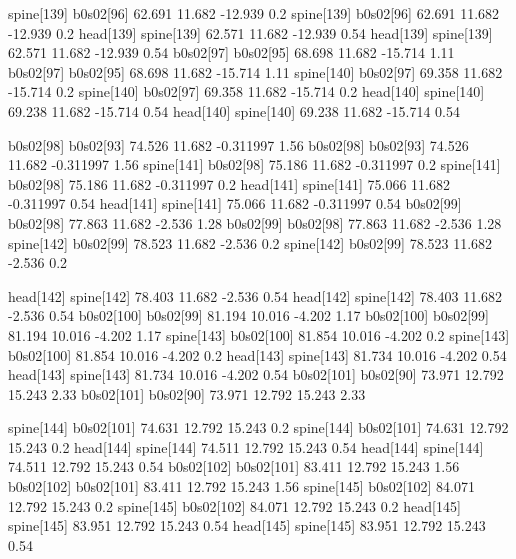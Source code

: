 spine[139]    b0s02[96]    62.691    11.682    -12.939    0.2
spine[139]    b0s02[96]    62.691    11.682    -12.939    0.2
head[139]    spine[139]    62.571    11.682    -12.939    0.54
head[139]    spine[139]    62.571    11.682    -12.939    0.54
b0s02[97]    b0s02[95]    68.698    11.682    -15.714    1.11
b0s02[97]    b0s02[95]    68.698    11.682    -15.714    1.11
spine[140]    b0s02[97]    69.358    11.682    -15.714    0.2
spine[140]    b0s02[97]    69.358    11.682    -15.714    0.2
head[140]    spine[140]    69.238    11.682    -15.714    0.54
head[140]    spine[140]    69.238    11.682    -15.714    0.54


b0s02[98]    b0s02[93]    74.526    11.682    -0.311997    1.56
b0s02[98]    b0s02[93]    74.526    11.682    -0.311997    1.56
spine[141]    b0s02[98]    75.186    11.682    -0.311997    0.2
spine[141]    b0s02[98]    75.186    11.682    -0.311997    0.2
head[141]    spine[141]    75.066    11.682    -0.311997    0.54
head[141]    spine[141]    75.066    11.682    -0.311997    0.54
b0s02[99]    b0s02[98]    77.863    11.682    -2.536    1.28
b0s02[99]    b0s02[98]    77.863    11.682    -2.536    1.28
spine[142]    b0s02[99]    78.523    11.682    -2.536    0.2
spine[142]    b0s02[99]    78.523    11.682    -2.536    0.2


head[142]    spine[142]    78.403    11.682    -2.536    0.54
head[142]    spine[142]    78.403    11.682    -2.536    0.54
b0s02[100]    b0s02[99]    81.194    10.016    -4.202    1.17
b0s02[100]    b0s02[99]    81.194    10.016    -4.202    1.17
spine[143]    b0s02[100]    81.854    10.016    -4.202    0.2
spine[143]    b0s02[100]    81.854    10.016    -4.202    0.2
head[143]    spine[143]    81.734    10.016    -4.202    0.54
head[143]    spine[143]    81.734    10.016    -4.202    0.54
b0s02[101]    b0s02[90]    73.971    12.792    15.243    2.33
b0s02[101]    b0s02[90]    73.971    12.792    15.243    2.33


spine[144]    b0s02[101]    74.631    12.792    15.243    0.2
spine[144]    b0s02[101]    74.631    12.792    15.243    0.2
head[144]    spine[144]    74.511    12.792    15.243    0.54
head[144]    spine[144]    74.511    12.792    15.243    0.54
b0s02[102]    b0s02[101]    83.411    12.792    15.243    1.56
b0s02[102]    b0s02[101]    83.411    12.792    15.243    1.56
spine[145]    b0s02[102]    84.071    12.792    15.243    0.2
spine[145]    b0s02[102]    84.071    12.792    15.243    0.2
head[145]    spine[145]    83.951    12.792    15.243    0.54
head[145]    spine[145]    83.951    12.792    15.243    0.54


